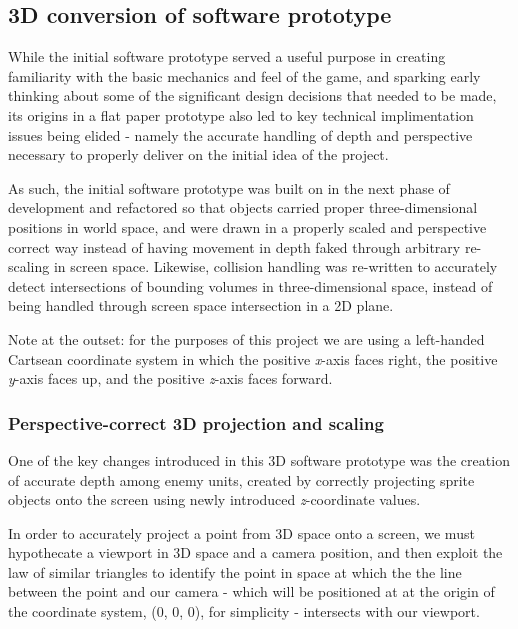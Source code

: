 \documentclass[11pt]{article}
\begin{document}
\subsection{3D conversion of software prototype}\label{conversion}

While the initial software prototype served a useful purpose in creating familiarity
with the basic mechanics and feel of the game, and sparking early thinking about some of the
significant design decisions that needed to be made, its origins in a flat paper prototype
also led to key technical implimentation issues being elided - namely the accurate handling
of depth and perspective necessary to properly deliver on the initial idea of the project.

As such, the initial software prototype was built on in the next phase of development and refactored
so that objects carried proper three-dimensional positions in world space, and were drawn in a
properly scaled and perspective correct way instead of having movement in depth faked through
arbitrary re-scaling in screen space. Likewise, collision handling was re-written to accurately detect
intersections of bounding volumes in three-dimensional space, instead of being handled through
screen space intersection in a 2D plane.

Note at the outset: for the purposes of this project we are using a left-handed Cartsean coordinate
system in which the positive \textit{x}-axis faces right, the positive \textit{y}-axis faces up, and
the positive \textit{z}-axis faces forward.

\subsubsection*{Perspective-correct 3D projection and scaling}
One of the key changes introduced in this 3D software prototype was the creation of accurate
depth among enemy units, created by correctly projecting sprite objects onto the screen using
newly introduced \textit{z}-coordinate values.

In order to accurately project a point from 3D space onto a screen, we must hypothecate a viewport in 3D space
and a camera position, and then exploit the law of similar triangles to identify the point in space at
which the the line between the point and our camera - which will be positioned at at the origin of the
coordinate system, (0, 0, 0), for simplicity - intersects with our viewport.
\end{document}
